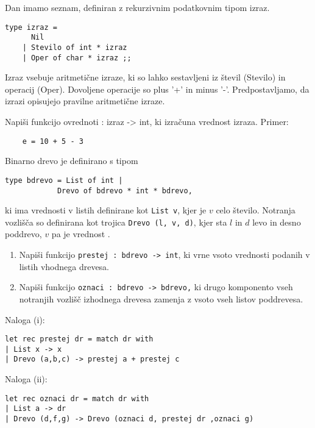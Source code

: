 \begin{ex}
Dan imamo seznam, definiran z rekurzivnim podatkovnim tipom izraz. 
\begin{lstlisting}
type izraz = 
      Nil 
    | Stevilo of int * izraz 
    | Oper of char * izraz ;; 
\end{lstlisting}
Izraz vsebuje aritmeti\v cne izraze, ki so lahko sestavljeni iz \v stevil (Stevilo) in operacij (Oper). Dovoljene operacije so plus '+' in minus '-'. Predpostavljamo, da izrazi opisujejo pravilne aritmeti\v cne izraze.

Napi\v si funkcijo ovrednoti : izraz -> int, ki izra\v cuna vrednost izraza.
Primer: 
\begin{lstlisting} 
    e = 10 + 5 - 3
\end{lstlisting}

\end{ex}






\begin{ex}
  Binarno drevo je definirano s tipom
\begin{lstlisting}
type bdrevo = List of int |
            Drevo of bdrevo * int * bdrevo,
\end{lstlisting}
  ki ima vrednosti v listih definirane kot \lstinline{List v}, kjer je
  $v$ celo \v stevilo.  Notranja vozli\v s\v ca so definirana kot
  trojica \lstinline{Drevo (l, v, d)}, kjer sta $l$ in $d$ levo in desno
  poddrevo, $v$ pa je vrednost%
.
  \begin{enumerate}[label=(\roman*)]
  \item Napi\v si funkcijo \lstinline{prestej : bdrevo -> int}, 
    ki vrne vsoto vrednosti podanih v listih vhodnega drevesa.

  \item Napi\v si funkcijo
    \lstinline{oznaci : bdrevo -> bdrevo,}
    ki drugo komponento vseh notranjih vozli\v s\v c izhodnega drevesa
    zamenja z vsoto vseh listov poddrevesa.
  \end{enumerate}
\begin{sol}
Naloga (i):
\begin{lstlisting}
let rec prestej dr = match dr with
| List x -> x
| Drevo (a,b,c) -> prestej a + prestej c
\end{lstlisting}
Naloga (ii):
\begin{lstlisting}
let rec oznaci dr = match dr with
| List a -> dr 
| Drevo (d,f,g) -> Drevo (oznaci d, prestej dr ,oznaci g)
\end{lstlisting}
\end{sol}
\end{ex}




